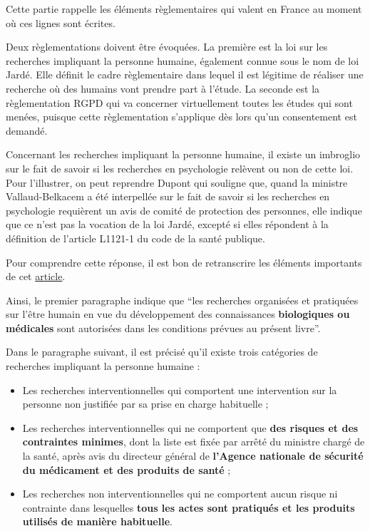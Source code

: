 \documentclass[
  12pt,
]{book}
\begin{document}
Cette partie rappelle les éléments règlementaires qui valent en France au moment où ces lignes sont écrites.

Deux règlementations doivent être évoquées. La première est la loi sur les recherches impliquant la personne humaine, également connue sous le nom de loi Jardé. Elle définit le cadre règlementaire dans lequel il est légitime de réaliser une recherche où des humains vont prendre part à l'étude. La seconde est la règlementation RGPD qui va concerner virtuellement toutes les études qui sont menées, puisque cette règlementation s'applique dès lors qu'un consentement est demandé.

Concernant les recherches impliquant la personne humaine, il existe un imbroglio sur le fait de savoir si les recherches en psychologie relèvent ou non de cette loi. Pour l'illustrer, on peut reprendre Dupont \citeyearpar{Dupont2019} qui souligne que, quand la ministre Vallaud-Belkacem a été interpellée sur le fait de savoir si les recherches en psychologie requièrent un avis de comité de protection des personnes, elle indique que ce n'est pas la vocation de la loi Jardé, excepté si elles répondent à la définition de l'article L1121-1 du code de la santé publique.

Pour comprendre cette réponse, il est bon de retranscrire les éléments importants de cet \href{https://www.legifrance.gouv.fr/codes/article_lc/LEGIARTI000046125746}{article}.

Ainsi, le premier paragraphe indique que ``les recherches organisées et pratiquées sur l'être humain en vue du développement des connaissances \textbf{biologiques ou médicales} sont autorisées dans les conditions prévues au présent livre''.

Dans le paragraphe suivant, il est précisé qu'il existe trois catégories de recherches impliquant la personne humaine :

\begin{itemize}
\item
  Les recherches interventionnelles qui comportent une intervention sur la personne non justifiée par sa prise en charge habituelle ;
\item
  Les recherches interventionnelles qui ne comportent que \textbf{des risques et des contraintes minimes}, dont la liste est fixée par arrêté du ministre chargé de la santé, après avis du directeur général de \textbf{l'Agence nationale de sécurité du médicament et des produits de santé} ;
\item
  Les recherches non interventionnelles qui ne comportent aucun risque ni contrainte dans lesquelles \textbf{tous les actes sont pratiqués et les produits utilisés de manière habituelle}.
\end{itemize}
\end{document}
